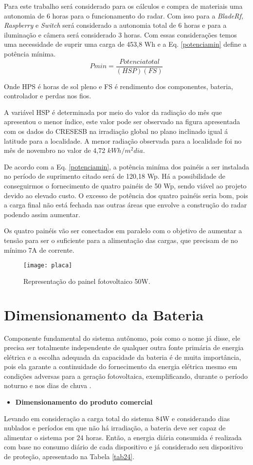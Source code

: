 Para este trabalho será considerado para os cálculos e compra de materiais uma autonomia de 6 horas para o funcionamento do radar. Com isso para a \textit{BladeRf, Raspberry} e \textit{Switch} será considerado a autonomia total de 6 horas e para a iluminação e câmera será considerado 3 horas. Com essas considerações temos uma necessidade de suprir uma carga de 453,8 Wh e a Eq. \ref{potenciamin} define a potência mínima.
\begin{equation}
    Pmin = \frac{Potencia total}{(HSP)(FS)} 
    \label{potenciamin}
\end{equation}

Onde HPS é horas de sol pleno e FS é rendimento dos componentes, bateria, controlador e perdas nos fios.

A variável HSP é determinada por meio do valor da radiação do mês que apresentou o menor índice, este valor pode ser observado na figura apresentada com os dados do CRESESB \cite{solar} na irradiação global no plano inclinado igual á latitude para a localidade. A menor radiação observada para a localidade foi no mês de novembro no valor de 4,72 $kWh/m^2dia$. 
 
De acordo com a Eq. \ref{potenciamin}, a potência miníma dos painéis a ser instalada no período de suprimento citado será de 120,18 Wp. Há a possibilidade de conseguirmos o fornecimento de quatro painéis de 50 Wp, sendo viável ao projeto devido ao elevado custo. O excesso de potência dos quatro painéis seria bom, pois a carga final não está fechada nas outras áreas que envolve a construção do radar podendo assim aumentar. 

Os quatro painéis vão ser conectados em paralelo com o objetivo de aumentar a tensão para ser o suficiente para a alimentação das cargas, que precisam de no mínimo 7A de corrente. 

\begin{figure}[h!]
\centering
\texttt{[image: placa]}
\caption{Representação do painel fotovoltaico 50W.}
\label{fig:tabela}
\end{figure}

\section{Dimensionamento da Bateria}
Componente fundamental do sistema autônomo, pois como o nome já disse, ele precisa ser totalmente independente de qualquer outra fonte primária de energia elétrica e a escolha adequada da capacidade da bateria é de muita importância, pois ela garante a continuidade do fornecimento da energia elétrica mesmo em condições adversas para a geração fotovoltaica, exemplificando, durante o período noturno e nos dias de chuva \cite{alan}.
\begin{itemize}
 \item\textbf{Dimensionamento do produto comercial}
\end{itemize}
Levando em consideração a carga total do sistema 84W e considerando dias nublados e períodos em que não há irradiação, a bateria deve ser capaz de alimentar o sistema por 24 horas.
Então, a energia diária consumida é realizada com base no consumo diário de cada dispositivo e já considerado seu dispositivo de proteção, apresentado na Tabela \ref{tab24}.

